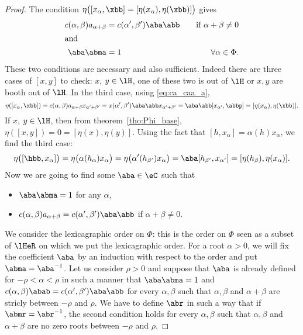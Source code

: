 \begin{proof}
The condition $\eta\big(  [ x_{\alpha},\xbb]=[\eta( x_{\alpha}),\eta(\xbb)]  \big)$ gives
\begin{subequations}
\begin{align}
\label{eq:ca_caa_a}
c(\alpha,\beta)a_{\alpha+\beta}&=c(\alpha',\beta')\aba\abb&\quad\text{if }\alpha+\beta\neq 0\\
\intertext{and}
\label{eq:ca_caa_b}
\aba\abma &=1                        &\quad\forall\alpha\in\Phi.
\end{align}
\end{subequations}
These two conditions are necessary and also sufficient. Indeed there are three cases of $[x,y]$ to check: $x$, $y\in\lH$, one of these two is out of $\lH$ or $x,y$ are booth out of $\lH$. In the third case, using \eqref{eq:ca_caa_a},
\begin{equation}
\eta([ x_{\alpha},\xbb])=c(\alpha,\beta)a_{\alpha+\beta}x_{\alpha'+\beta'}
            =x(\alpha',\beta')\aba\abb x_{\alpha'+\beta'}
            =\aba\abb[x_{\alpha'},\abbp]
            =[\eta( x_{\alpha}),\eta(\xbb)].
\end{equation}
If $x$, $y\in\lH$, then from theorem~\ref{tho:Phi_base}, $\eta([x,y])=0=[\eta(x),\eta(y)]$. Using the fact that $[h, x_{\alpha}]=\alpha(h) x_{\alpha}$, we find the third case:
\begin{equation}
\eta\big(  [\hbb, x_{\alpha}]  \big)=\eta\big(  \alpha( h_{\alpha}) x_{\alpha}  \big)
                =\eta\big(  \alpha'(h_{\beta'}) x_{\alpha}  \big)
                =\aba[h_{\beta'},x_{\alpha'}]
                =[\eta(h_{\beta}),\eta( x_{\alpha})].
\end{equation}
Now we are going to find some $\aba\in\eC$ such that
\begin{itemize}
\item $\aba\abma=1$ for any $\alpha$,
\item $c(\alpha,\beta)a_{\alpha+\beta}=c(\alpha',\beta')\aba\abb$ if $\alpha+\beta\neq 0$.
\end{itemize}
We consider the lexicagraphic order  on $\Phi$: this is the order on $\Phi$ seen as a subset of $\lHeR$ on which we put the lexicagraphic order. For a root $\alpha>0$, we will fix the coefficient $\aba$ by an induction with respect to the order and put $\abma=\aba^{-1}$. Let us consider $\rho>0$ and suppose that $\aba$ is already defined for $-\rho<\alpha<\rho$ in such a manner that $\aba\abma=1$ and $c(\alpha,\beta)\abab=c(\alpha',\beta')\aba\abb$ for every $\alpha,\beta$ such that $\alpha,\beta$ and $\alpha+\beta$ are stricly between $-\rho$ and $\rho$. We have to define $\abr$ in such a way that if $\abmr=\abr^{-1}$, the second condition holds for every $\alpha,\beta$ such that $\alpha,\beta$ and $\alpha+\beta$ are no zero roots between $-\rho$ and $\rho$.


\end{proof}
